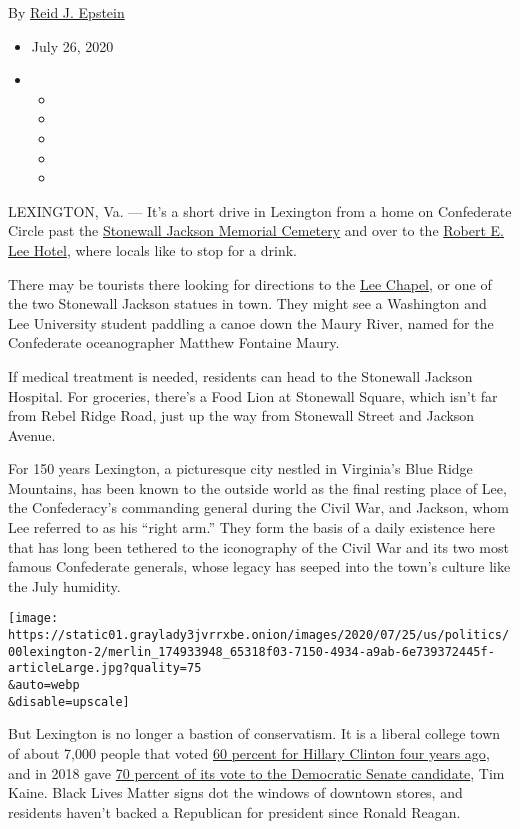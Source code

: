 By \href{https://www.nytimes3xbfgragh.onion/by/reid-j-epstein}{Reid J.
Epstein}

\begin{itemize}
\item
  July 26, 2020
\item
  \begin{itemize}
  \item
  \item
  \item
  \item
  \item
  \end{itemize}
\end{itemize}

LEXINGTON, Va. --- It's a short drive in Lexington from a home on
Confederate Circle past the
\href{https://lexingtonvirginia.com/directory/attractions/stonewall-jackson-memorial-cemetery}{Stonewall
Jackson Memorial Cemetery} and over to the
\href{https://roberteleehotel.com/}{Robert E. Lee Hotel}, where locals
like to stop for a drink.

There may be tourists there looking for directions to the
\href{https://my.wlu.edu/lee-chapel-and-museum}{Lee Chapel}, or one of
the two Stonewall Jackson statues in town. They might see a Washington
and Lee University student paddling a canoe down the Maury River, named
for the Confederate oceanographer Matthew Fontaine Maury.

If medical treatment is needed, residents can head to the Stonewall
Jackson Hospital. For groceries, there's a Food Lion at Stonewall
Square, which isn't far from Rebel Ridge Road, just up the way from
Stonewall Street and Jackson Avenue.

For 150 years Lexington, a picturesque city nestled in Virginia's Blue
Ridge Mountains, has been known to the outside world as the final
resting place of Lee, the Confederacy's commanding general during the
Civil War, and Jackson, whom Lee referred to as his ``right arm.'' They
form the basis of a daily existence here that has long been tethered to
the iconography of the Civil War and its two most famous Confederate
generals, whose legacy has seeped into the town's culture like the July
humidity.

\texttt{[image: https://static01.graylady3jvrrxbe.onion/images/2020/07/25/us/politics/00lexington-2/merlin\_174933948\_65318f03-7150-4934-a9ab-6e739372445f-articleLarge.jpg?quality=75\\\&auto=webp\\\&disable=upscale]}

But Lexington is no longer a bastion of conservatism. It is a liberal
college town of about 7,000 people that voted
\href{https://www.nytimes3xbfgragh.onion/elections/2016/results/virginia}{60
percent for Hillary Clinton four years ago}, and in 2018 gave
\href{https://www.nytimes3xbfgragh.onion/elections/results/virginia-senate}{70
percent of its vote to the Democratic Senate candidate}, Tim Kaine.
Black Lives Matter signs dot the windows of downtown stores, and
residents haven't backed a Republican for president since Ronald Reagan.

